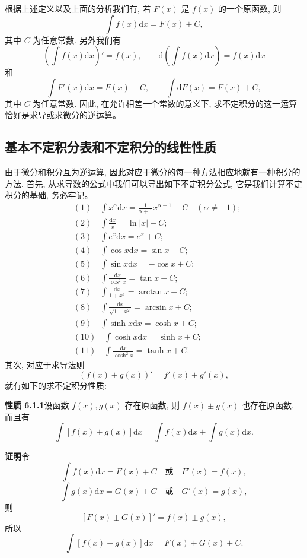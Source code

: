 \documentclass[UTF8,12pt,a4paper,fontset=fandol]{ctexart}
\begin{document}
根据上述定义以及上面的分析我们有, 若 $F(x)$ 是 $f(x)$ 的一个原函数, 则
\[
  \int f(x)\mathrm dx=F(x)+C,
\]
其中 $C$ 为任意常数. 另外我们有
\[
  \left(\int f(x)\mathrm dx\right)'=f(x),
  \qquad
  \mathrm d\left(\int f(x)\mathrm dx\right)=f(x)\mathrm dx
\]
和
\[
  \int F'(x)\mathrm dx=F(x)+C,
  \qquad
  \int \mathrm dF(x)=F(x)+C,
\]
其中 $C$ 为任意常数. 因此, 在允许相差一个常数的意义下, 求不定积分的这一运算恰好是求导或求微分的逆运算。

\subsection{基本不定积分表和不定积分的线性性质}

由于微分和积分互为逆运算, 因此对应于微分的每一种方法相应地就有一种积分的方法. 首先, 从求导数的公式中我们可以导出如下不定积分公式, 它是我们计算不定积分的基础, 务必牢记。
\[
\begin{aligned}
  &(1)\quad \int x^\alpha\mathrm dx=\frac1{\alpha+1}x^{\alpha+1}+C
  \quad(\alpha\ne-1);\\
  &(2)\quad \int\frac{\mathrm dx}{x}=\ln|x|+C;\\
  &(3)\quad \int e^x\mathrm dx=e^x+C;\\
  &(4)\quad \int\cos x\mathrm dx=\sin x+C;\\
  &(5)\quad \int\sin x\mathrm dx=-\cos x+C;\\
  &(6)\quad \int\frac{\mathrm dx}{\cos^2x}=\tan x+C;\\
  &(7)\quad \int\frac{\mathrm dx}{1+x^2}=\arctan x+C;\\
  &(8)\quad \int\frac{\mathrm dx}{\sqrt{1-x^2}}=\arcsin x+C;\\
  &(9)\quad \int\sinh x\mathrm dx=\cosh x+C;\\
  &(10)\quad \int\cosh x\mathrm dx=\sinh x+C;\\
  &(11)\quad \int\frac{\mathrm dx}{\cosh^2x}=\tanh x+C.
\end{aligned}
\]
其次, 对应于求导法则
\[
  (f(x)\pm g(x))'=f'(x)\pm g'(x),
\]
就有如下的求不定积分性质:

\noindent\textbf{性质 6.1.1}\quad 设函数 $f(x),g(x)$ 存在原函数, 则 $f(x)\pm g(x)$ 也存在原函数, 而且有
\[
  \int[f(x)\pm g(x)]\mathrm dx
  =
  \int f(x)\mathrm dx\pm\int g(x)\mathrm dx.
\]

\noindent\textbf{证明}\quad 令
\[
  \int f(x)\mathrm dx=F(x)+C
  \quad\text{或}\quad
  F'(x)=f(x),
\]
\[
  \int g(x)\mathrm dx=G(x)+C
  \quad\text{或}\quad
  G'(x)=g(x),
\]
则
\[
  [F(x)\pm G(x)]'=f(x)\pm g(x),
\]
所以
\[
  \int[f(x)\pm g(x)]\mathrm dx=F(x)\pm G(x)+C.
\]
\end{document}
